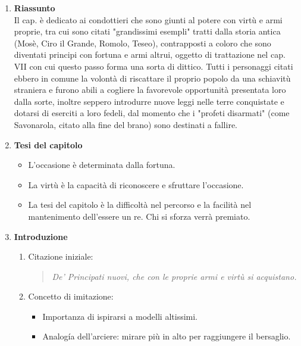 \documentclass{article}
\begin{document}
\begin{enumerate}
    \item \textbf{Riassunto}\\
        Il cap. è dedicato ai condottieri che sono giunti al potere con virtù e armi proprie, tra cui sono citati 
        "grandissimi esempli" tratti dalla storia antica (Mosè, Ciro il Grande, Romolo, Teseo), contrapposti 
        a coloro che sono diventati principi con fortuna e armi altrui, oggetto di trattazione nel cap. VII con 
        cui questo passo forma una sorta di dittico. Tutti i personaggi citati ebbero in comune la volontà di 
        riscattare il proprio popolo da una schiavitù straniera e furono abili a cogliere la favorevole 
        opportunità presentata loro dalla sorte, inoltre seppero introdurre nuove leggi nelle terre 
        conquistate e dotarsi di eserciti a loro fedeli, dal momento che i "profeti disarmati" (come 
        Savonarola, citato alla fine del brano) sono destinati a fallire.
    \item \textbf{Tesi del capitolo}
        \begin{itemize}
            \item L'occasione è determinata dalla fortuna.
            \item La virtù è la capacità di riconoscere e sfruttare l'occasione.
            \item La tesi del capitolo è la difficoltà nel percorso e la facilità nel mantenimento 
                dell'essere un re. Chi si sforza verrà premiato.
        \end{itemize}

    \item \textbf{Introduzione}
    \begin{enumerate}[label*=\arabic*.]
        \item Citazione iniziale:
        \begin{quote}
            \itshape
            De' Principati nuovi, che con le proprie armi e virtù si acquistano.
        \end{quote}
        \item Concetto di imitazione:
        \begin{itemize}
            \item Importanza di ispirarsi a modelli altissimi.
            \item Analogía dell'arciere: mirare più in alto per raggiungere il bersaglio.
        \end{itemize}
    \end{enumerate}


\end{enumerate}
\end{document}
